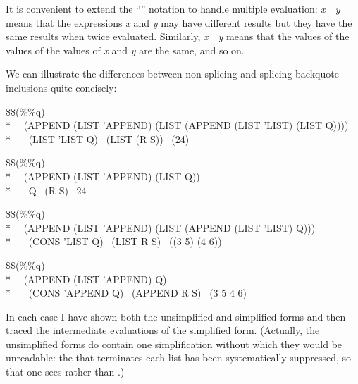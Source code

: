 \begin{new}
It is convenient to extend the ``\EQ'' notation to handle multiple evaluation:
{\it x}~\EQ\EQ~{\it y} means that the expressions {\it x} and {\it y} may have
different results but they have the same results when twice evaluated.
Similarly, {\it x}~\EQ\EQ\EQ~{\it y} means that the values of the values of the
values of {\it x} and {\it y} are the same, and so on.

We can illustrate the differences between non-splicing and splicing
backquote inclusions quite concisely:
\begin{lisp}
\$\$(\%\%q)~~\EQ \\*
~~(APPEND (LIST 'APPEND) (LIST (APPEND (LIST 'LIST) (LIST Q)))) \\*
~~\EQ\EQ\ (LIST 'LIST Q) \EV\ (LIST (R S)) \EV\ (24)
\end{lisp}
\begin{lisp}
\$\$(\%{\Xatsign}\%q) \EQ \\*
~~(APPEND (LIST 'APPEND) (LIST Q)) \\*
~~\EQ\EQ\ Q \EV\ (R S) \EV\ 24
\end{lisp}
\begin{lisp}
\$\$(\%\%{\Xatsign}q) \EQ \\*
~~(APPEND (LIST 'APPEND) (LIST (APPEND (LIST 'LIST) Q))) \\*
~~\EQ\EQ\ (CONS 'LIST Q) \EV\ (LIST R S) \EV\ ((3 5) (4 6))
\end{lisp}
\begin{lisp}
\$\$(\%{\Xatsign}\%{\Xatsign}q) \EQ \\*
~~(APPEND (LIST 'APPEND) Q) \\*
~~\EQ\EQ\ (CONS 'APPEND Q) \EV\ (APPEND R S) \EV\ (3 5 4 6)
\end{lisp}
In each case I have shown both the unsimplified and simplified forms
and then traced the intermediate evaluations of the simplified form.
(Actually, the unsimplified forms do contain one simplification
without which they would be unreadable:
the  that terminates each list has been systematically suppressed,
so that one sees  rather than
.)


\end{new}
